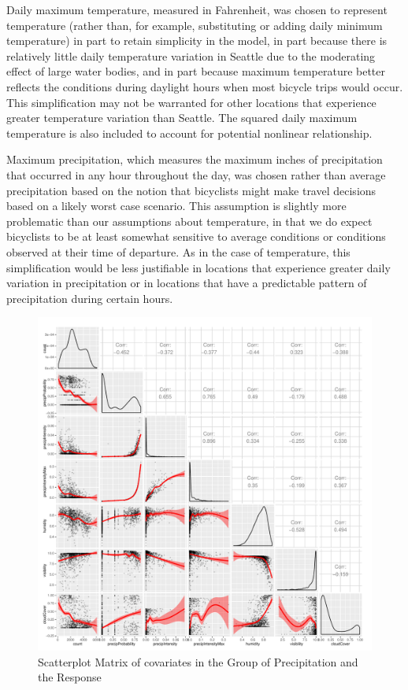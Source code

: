 \documentclass [11pt, proquest] {uwthesis}[2015/03/03]
\begin{document}
Daily maximum temperature, measured in Fahrenheit, was chosen to
represent temperature (rather than, for example, substituting or
adding daily minimum temperature) in part to retain simplicity in the
model, in part because there is relatively little daily temperature
variation in Seattle due to the moderating effect of large water
bodies, and in part because maximum temperature better reflects the
conditions during daylight hours when most bicycle trips would occur.
This simplification may not be warranted for other locations that
experience greater temperature variation than Seattle. The squared daily maximum temperature is also included to account for potential nonlinear relationship.

Maximum precipitation, which measures the maximum inches of
precipitation that occurred in any hour throughout the day, was chosen
rather than average precipitation based on the notion that bicyclists
might make travel decisions based on a likely worst case scenario.
This assumption is slightly more problematic than our assumptions
about temperature, in that we do expect bicyclists to be at least
somewhat sensitive to average conditions or conditions observed at
their time of departure. As in the case of temperature, this
simplification would be less justifiable in locations that experience
greater daily variation in precipitation or in locations that have a
predictable pattern of precipitation during certain hours.

\begin{figure}
   \includegraphics[width=1\textwidth]{figures/matrix1} 
  \caption{Scatterplot Matrix of covariates in the Group of Precipitation and the Response}
  \label{fig:precip_corr}
\end{figure}
\end{document}
